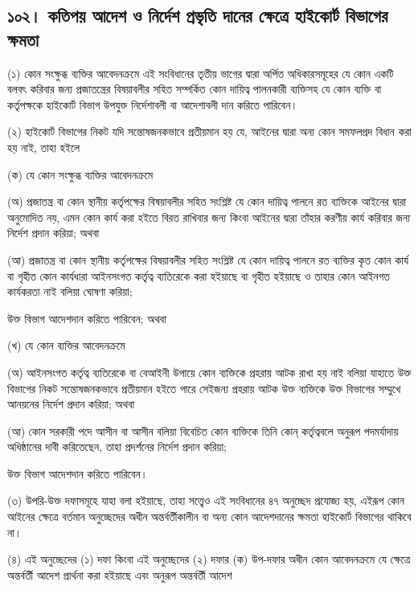 \documentclass[11pt]{article}
\begin{document}
\subsection{১০২। কতিপয় আদেশ ও নির্দেশ প্রভৃতি দানের ক্ষেত্রে হাইকোর্ট বিভাগের ক্ষমতা}
\label{sec:org03f9888}
(১) কোন সংক্ষুব্ধ ব্যক্তির আবেদনক্রমে এই সংবিধানের তৃতীয় ভাগের দ্বারা অর্পিত
    অধিকারসমূহের যে কোন একটি বলবৎ করিবার জন্য প্রজাতন্ত্রের বিষয়াবলীর সহিত
    সম্পর্কিত কোন দায়িত্ব পালনকারী ব্যক্তিসহ যে কোন ব্যক্তি বা কর্তৃপক্ষকে হাইকোর্ট
    বিভাগ উপযুক্ত নির্দেশাবলী বা আদেশাবলী দান করিতে পারিবেন।

(২) হাইকোর্ট বিভাগের নিকট যদি সন্তোষজনকভাবে প্রতীয়মান হয় যে, আইনের দ্বারা
    অন্য কোন সমফলপ্রদ বিধান করা হয় নাই, তাহা হইলে

(ক) যে কোন সংক্ষুব্ধ ব্যক্তির আবেদনক্রমে

(অ) প্রজাতন্ত্র বা কোন স্থানীয় কর্তৃপক্ষের বিষয়াবলীর সহিত সংশ্লিষ্ট যে কোন
দায়িত্ব পালনে রত ব্যক্তিকে আইনের দ্বারা অনুমোদিত নয়, এমন কোন কার্য করা হইতে
বিরত রাখিবার জন্য কিংবা আইনের দ্বারা তাঁহার করণীয় কার্য করিবার জন্য নির্দেশ
প্রদান করিয়া; অথবা

(আ) প্রজাতন্ত্র বা কোন স্থানীয় কর্তৃপক্ষের বিষয়াবলীর সহিত সংশ্লিষ্ট যে কোন
দায়িত্ব পালনে রত ব্যক্তির কৃত কোন কার্য বা গৃহীত কোন কার্যধারা আইনসংগত কর্তৃত্ব
ব্যতিরেকে করা হইয়াছে বা গৃহীত হইয়াছে ও তাহার কোন আইনগত কার্যকরতা নাই
বলিয়া ঘোষণা করিয়া;

উক্ত বিভাগ আদেশদান করিতে পারিবেন; অথবা

(খ) যে কোন ব্যক্তির আবেদনক্রমে

(অ) আইনসংগত কর্তৃত্ব ব্যতিরেকে বা বেআইনী উপায়ে কোন ব্যক্তিকে প্রহরায় আটক রাখা
হয় নাই বলিয়া যাহাতে উক্ত বিভাগের নিকট সন্তোষজনকভাবে প্রতীয়মান হইতে পারে
সেইজন্য প্রহরায় আটক উক্ত ব্যক্তিকে উক্ত বিভাগের সম্মুখে আনয়নের নির্দেশ প্রদান
করিয়া; অথবা

(আ) কোন সরকারী পদে আসীন বা আসীন বলিয়া বিবেচিত কোন ব্যক্তিকে তিনি কোন্
কর্তৃত্ববলে অনুরূপ পদমর্যাদায় অধিষ্ঠানের দাবী করিতেছেন, তাহা প্রদর্শনের নির্দেশ
প্রদান করিয়া;

উক্ত বিভাগ আদেশদান করিতে পারিবেন।

(৩) উপরি-উক্ত দফাসমূহে যাহা বলা হইয়াছে, তাহা সত্ত্বেও এই সংবিধানের ৪৭
    অনুচ্ছেদ প্রযোজ্য হয়, এইরূপ কোন আইনের ক্ষেত্রে বর্তমান অনুচ্ছেদের অধীন
    অন্তর্বর্তীকালীন বা অন্য কোন আদেশদানের ক্ষমতা হাইকোর্ট বিভাগের থাকিবে না।

(৪) এই অনুচ্ছেদের (১) দফা কিংবা এই অনুচ্ছেদের (২) দফার (ক) উপ-দফার অধীন
    কোন আবেদনক্রমে যে ক্ষেত্রে অন্তর্বর্তী আদেশ প্রার্থনা করা হইয়াছে এবং অনুরূপ
    অন্তর্বর্তী আদেশ
\end{document}
